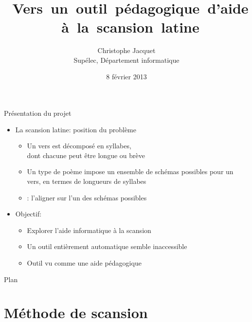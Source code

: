 \documentclass{beamer}
\title{\mbox{ Vers un outil pédagogique d'aide à la scansion latine} }
\author{Christophe Jacquet\\
{\footnotesize Supélec, Département informatique}
}
\date{8 février 2013}
\begin{document}
\maketitle


\begin{frame}{Présentation du projet}

\begin{itemize}
\item La scansion latine: position du problème

\begin{itemize}
\item Un vers est décomposé en syllabes,\\ dont chacune peut être longue ou brève
\item Un type de poème impose un ensemble de schémas possibles pour un vers, en termes de longueurs de syllabes
\item {}: l'aligner sur l'un des schémas possibles
\end{itemize}

\vfill

\item Objectif:

\begin{itemize}
\item Explorer l'aide informatique à la scansion
\item Un outil entièrement automatique semble inaccessible
\item Outil vu comme une aide pédagogique
\end{itemize}

\end{itemize}

\end{frame} %


\begin{frame}{Plan}

\tableofcontents

\end{frame} %


\section{Méthode de scansion}
\end{document}
